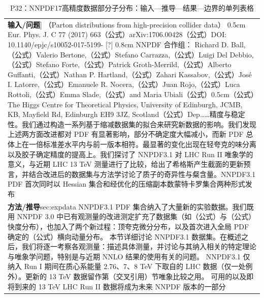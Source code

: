 \documentclass[UTF8,11pt,oneside]{ctexbook}
\begin{document}
\begin{table}[htbp]
  \centering
  \caption*{P32：NNPDF17高精度数据部分子分布：输入—推导—结果—边界的单列表格}
  \small
  \begin{tabular}{@{}p{}@{}}
    \toprule
    \textbf{输入/问题}\quad 0.25cm] （Parton distributions from high-precision collider data） 0.5cm Eur. Phys. J. C 77 (2017) 663（公式）arXiv:1706.00428（公式）DOI: 10.1140/epjc/s10052-017-5199- [?] 0.8cm NNPDF 合作组： Richard D. Ball,（公式）Valerio Bertone,（公式）Stefano Carrazza,（公式）Luigi Del Debbio,（公式）Stefano Forte,（公式）Patrick Groth-Merrild,（公式）Alberto Guffanti,（公式）Nathan P. Hartland,（公式）Zahari Kassabov,（公式）José I. Latorre,（公式）Emanuele R. Nocera,（公式）Juan Rojo,（公式）Luca Rottoli,（公式）Emma Slade,（公式）and Maria Ubiali（公式）0.5cm（公式）The Higgs Centre for Theoretical Physics, University of Edinburgh, JCMB, KB, Mayfield Rd, Edinburgh EH9 3JZ, Scotland（公式）Dep……精度与稳定性。我们通过构造一系列基于缩减数据集的拟合来研究新数据的影响。我们发现上述两方面改进都对 PDF 有显著影响，部分不确定度大幅减小，而新 PDF 总体上在一倍标准差水平内与前一版本相符。最显著的变化出现在轻夸克的味分离以及胶子确定精度的提高上。我们探讨了 NNPDF3.1 对 LHC Run II 唯象学的意义，与近期 LHC 13 TeV 测量进行了比较，给出了希格斯产生截面的更新预言，并结合改进后的数据集与方法学讨论了质子的奇异性与粲含量。NNPDF3.1 PDF 首次同时以 Hessian 集合和经优化的压缩副本数蒙特卡罗集合两种形式发布 \\
    \textbf{方法/推导}\quad sec:expdata NNPDF3.1 PDF 集合纳入了大量新的实验数据。我们既用 NNPDF 3.0 中已有观测量的改进测定扩充了数据集（如（公式）与（公式）快度分布），也加入了两个新过程：顶夸克微分分布，以及首次进入全局 PDF 确定的（公式）横向动量分布。 本节详细讨论 NNPDF3.1 数据集。在概述之后，我们将逐一考察各观测量：描述具体测量，并讨论与其纳入相关的特定理论与唯象学问题，特别是与近期 NNLO 结果的使用有关的问题。 NNPDF3.1 仅纳入 Run I 期间在质心系能量 2.76、7、8 TeV 下取自的 LHC 数据（仅一处例外）。更新的 13 TeV 数据留作第（交叉引用）节唯象比较之用。 可用的以及即将到来的 13 TeV LHC Run II 数据将成为未来 NNPDF 版本的一部分 \\

\end{tabular}
\end{table}
\end{document}
